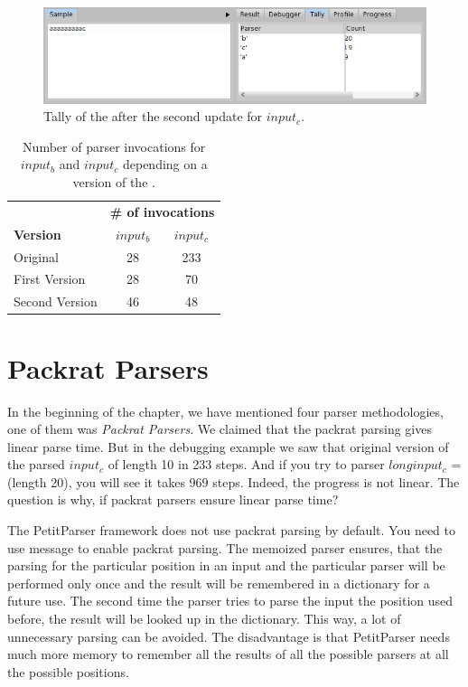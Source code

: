 \documentclass[a4paper,10pt,twoside]{book}
\begin{document}
\begin{figure}
  \begin{center}
    \includegraphics[width=\linewidth]{example-tallyAaac-update-2}
    \caption{Tally of the  after the second update for $input_c$. \label{fig:pp/example-tallyAaac-update-2}}
  \end{center}
\end{figure}

\begin{table}
  \centering
  \begin{tabular}{lcc}
                     & \multicolumn{2}{c}{\textbf{\# of invocations}}  \\
    \textbf{Version} & ${input_b}$ & ${input_c}$ \\
    \midrule
    Original          & 28 & 233 \\
    First Version     & 28 & 70  \\
    Second Version    & 46 & 48  \\
  \end{tabular}
  \caption{Number of parser invocations for $input_b$ and $input_c$ depending on a version of the .}
  \label{tab:example-tally}
\end{table}


\section{Packrat Parsers}

In the beginning of the chapter, we have mentioned four parser methodologies, one of them was \emph{Packrat Parsers}.
We claimed that the packrat parsing gives linear parse time.
But in the debugging example we saw that original version of the  parsed $input_c$ of length 10 in 233 steps. 
And if you try to parser $longinput_c$ =  (length 20), you will see it takes 969 steps.
Indeed, the progress is not linear.
The question is why, if packrat parsers ensure linear parse time?

The PetitParser framework does not use packrat parsing by default.
You need to use  message to enable packrat parsing.
The memoized parser ensures, that the parsing for the particular position in an input and the particular parser will be performed only once and the result will be remembered in a dictionary for a future use.
The second time the parser tries to parse the input the position used before, the result will be looked up in the dictionary.
This way, a lot of unnecessary parsing can be avoided.
The disadvantage is that PetitParser needs much more memory to remember all the results of all the possible parsers at all the possible positions.
\end{document}
